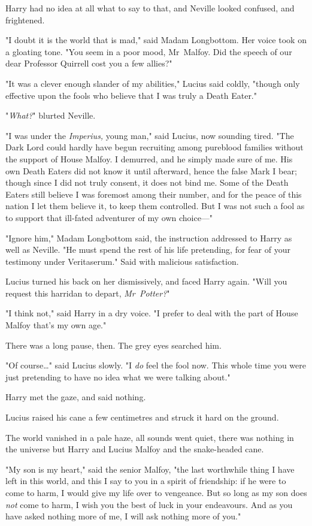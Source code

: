 Harry had no idea at all what to say to that, and Neville looked confused, and
frightened.

"I doubt it is the world that is mad," said Madam Longbottom. Her voice took on
a gloating tone. "You seem in a poor mood, Mr~Malfoy. Did the speech of our
dear Professor Quirrell cost you a few allies?"

"It was a clever enough slander of my abilities," Lucius said coldly, "though
only effective upon the fools who believe that I was truly a Death Eater."

"\emph{What?}" blurted Neville.

"I was under the \emph{Imperius,} young man," said Lucius, now sounding tired.
"The Dark Lord could hardly have begun recruiting among pureblood families
without the support of House Malfoy. I demurred, and he simply made sure of me.
His own Death Eaters did not know it until afterward, hence the false Mark I
bear; though since I did not truly consent, it does not bind me. Some of the
Death Eaters still believe I was foremost among their number, and for the peace
of this nation I let them believe it, to keep them controlled. But I was not
such a fool as to support that ill-fated adventurer of my own choice—"

"Ignore him," Madam Longbottom said, the instruction addressed to Harry as well
as Neville. "He must spend the rest of his life pretending, for fear of your
testimony under Veritaserum." Said with malicious satisfaction.

Lucius turned his back on her dismissively, and faced Harry again. "Will you
request this harridan to depart, \emph{Mr~Potter?}"

"I think not," said Harry in a dry voice. "I prefer to deal with the part of
House Malfoy that’s my own age."

There was a long pause, then. The grey eyes searched him.

"Of course…" said Lucius slowly. "I \emph{do} feel the fool now. This
whole time you were just pretending to have no idea what we were talking about."

Harry met the gaze, and said nothing.

Lucius raised his cane a few centimetres and struck it hard on the ground.

The world vanished in a pale haze, all sounds went quiet, there was nothing in
the universe but Harry and Lucius Malfoy and the snake-headed cane.

"My son is my heart," said the senior Malfoy, "the last worthwhile thing I have
left in this world, and this I say to you in a spirit of friendship: if he were
to come to harm, I would give my life over to vengeance. But so long as my son
does \emph{not} come to harm, I wish you the best of luck in your endeavours.
And as you have asked nothing more of me, I will ask nothing more of you."

